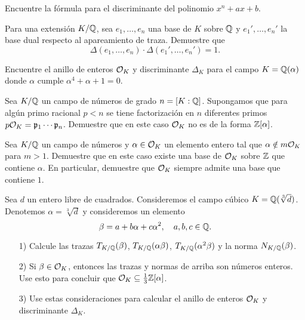 \begin{ejercicio}
  Encuentre la fórmula para el discriminante del polinomio $x^n + ax + b$.
\end{ejercicio}

\begin{ejercicio}
  Para una extensión $K/\mathbb{Q}$, sea $e_1,\ldots,e_n$ una base de $K$ sobre $\mathbb{Q}$
  y $e_1', \ldots, e_n'$ la base dual respecto al apareamiento de traza.
  Demuestre que
  $$\Delta (e_1,\ldots,e_n) \cdot \Delta (e_1', \ldots, e_n') = 1.$$
\end{ejercicio}

\begin{ejercicio}
  Encuentre el anillo de enteros $\mathcal{O}_K$ y discriminante $\Delta_K$ para el campo
  $K = \mathbb{Q} (\alpha)$ donde $\alpha$ cumple $\alpha^4 + \alpha + 1 = 0$.
\end{ejercicio}

\begin{ejercicio}
  Sea $K/\mathbb{Q}$ un campo de números de grado $n = [K : \mathbb{Q}]$. Supongamos que para
  algún primo racional $p < n$ se tiene factorización en $n$ diferentes primos
  $p\mathcal{O}_K = \mathfrak{p}_1 \cdots \mathfrak{p}_n$. Demuestre que en este caso
  $\mathcal{O}_K$ no es de la forma $\mathbb{Z} [\alpha]$.
\end{ejercicio}

\begin{ejercicio}
  Sea $K/\mathbb{Q}$ un campo de números y $\alpha \in \mathcal{O}_K$ un elemento entero tal que
  $\alpha \notin m \mathcal{O}_K$ para $m > 1$. Demuestre que en este caso
  existe una base de $\mathcal{O}_K$ sobre $\mathbb{Z}$ que contiene $\alpha$. En particular,
  demuestre que $\mathcal{O}_K$ siempre admite una base que contiene $1$.
\end{ejercicio}

\begin{ejercicio}
  \label{ejerc:anillo-de-enteros-cubico}
  Sea $d$ un entero libre de cuadrados. Consideremos el campo cúbico
  $K = \mathbb{Q} (\sqrt[3]{d})$. Denotemos $\alpha = \sqrt[3]{d}$ y consideremos
  un elemento
  $$\beta = a + b\alpha + c\alpha^2, \quad a,b,c \in \mathbb{Q}.$$

  \begin{enumerate}
  \item[1)] Calcule las trazas
    $T_{K/\mathbb{Q}} (\beta)$, $T_{K/\mathbb{Q}} (\alpha\beta)$, $T_{K/\mathbb{Q}} (\alpha^2\beta)$
    y la norma $N_{K/\mathbb{Q}} (\beta)$.

  \item[2)] Si $\beta \in \mathcal{O}_K$, entonces las trazas y normas de arriba son
    números enteros. Use esto para concluir que
    $\mathcal{O}_K  \subseteq \frac{1}{3} \mathbb{Z} [\alpha]$.

  \item[3)] Use estas consideraciones para calcular el anillo de enteros $\mathcal{O}_K$
    y discriminante $\Delta_K$.
  \end{enumerate}
\end{ejercicio}

